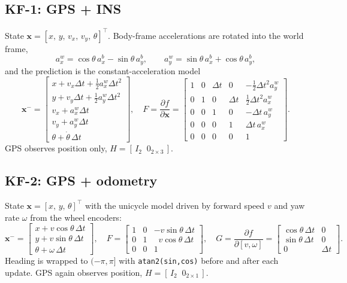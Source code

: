 \documentclass[11pt,a4paper]{article}
\begin{document}
\subsection{KF-1: GPS + INS}
State $\mathbf{x}=[x,\,y,\,v_x,\,v_y,\,\theta]^\top$. Body-frame accelerations are
rotated into the world frame,
\[
a^w_x=\cos\theta\,a^b_x-\sin\theta\,a^b_y,\qquad
a^w_y=\sin\theta\,a^b_x+\cos\theta\,a^b_y,
\]
and the prediction is the constant-acceleration model
\[
\mathbf{x}^- =
\begin{bmatrix}
x+v_x\Delta t+\tfrac12 a^w_x\Delta t^2\\
y+v_y\Delta t+\tfrac12 a^w_y\Delta t^2\\
v_x+a^w_x\Delta t\\
v_y+a^w_y\Delta t\\
\theta+\dot\theta\,\Delta t
\end{bmatrix},\quad
F=\frac{\partial f}{\partial\mathbf{x}}=
\begin{bmatrix}
1&0&\Delta t&0&-\tfrac12\Delta t^2 a^w_y\\
0&1&0&\Delta t&\tfrac12\Delta t^2 a^w_x\\
0&0&1&0&-\Delta t\,a^w_y\\
0&0&0&1&\Delta t\,a^w_x\\
0&0&0&0&1
\end{bmatrix}.
\]
GPS observes position only, $H=[\,I_{2}\;\;0_{2\times3}\,]$.

\subsection{KF-2: GPS + odometry}
State $\mathbf{x}=[x,\,y,\,\theta]^\top$ with the unicycle model driven by forward
speed $v$ and yaw rate $\omega$ from the wheel encoders:
\[
\mathbf{x}^-=
\begin{bmatrix}
x+v\cos\theta\,\Delta t\\
y+v\sin\theta\,\Delta t\\
\theta+\omega\,\Delta t
\end{bmatrix},\quad
F=\begin{bmatrix}
1&0&-v\sin\theta\,\Delta t\\
0&1&\;\;v\cos\theta\,\Delta t\\
0&0&1
\end{bmatrix},\quad
G=\frac{\partial f}{\partial[v,\omega]}=
\begin{bmatrix}
\cos\theta\,\Delta t&0\\
\sin\theta\,\Delta t&0\\
0&\Delta t
\end{bmatrix}.
\]
Heading is wrapped to $(-\pi,\pi]$ with \verb|atan2(sin,cos)| before and after each
update. GPS again observes position, $H=[\,I_2\;\;0_{2\times1}\,]$.
\end{document}
